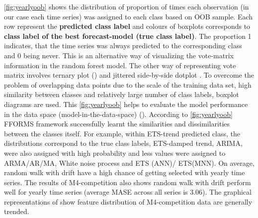 \documentclass[11pt,a4paper,]{article}
\begin{document}
\autoref{fig:yearlyoob} shows the distribution of proportion of times
each observation (in our case each time series) was assigned to each
class based on OOB sample. Each row represent the \textbf{predicted
class label} and colours of boxplots corresponds to \textbf{class label
of the best forecast-model (true class label)}. The proportion 1
indicates, that the time series was always predicted to the
corresponding class and 0 being never. This is an alternative way of
visualizing the vote-matrix information in the random forest model. The
other way of representing vote matrix involves ternary plot
(\textcite{sutherland2000orca}) and jittered side-by-side dotplot
\autocites{ehrlinger2015ggrandomforests}{da2017interactive}. To overcome
the problem of overlapping data points due to the scale of the training
data set, high similarity between classes and relatively large number of
class labels, boxplot diagrams are used. This \autoref{fig:yearlyoob}
helps to evaluate the model performance in the data space
(model-in-the-data-space) (\textcite{da2017interactive}). According to
\autoref{fig:yearlyoob} FFORMS framework successfully learnt the
similarities and dissimilarities between the classes itself. For
example, within ETS-trend predicted class, the distributions correspond
to the true class labels, ETS-damped trend, ARIMA, were also assigned
with high probability and less values were assigned to ARMA/AR/MA, White
noise process and ETS (ANN)/ ETS(MNN). On average, random walk with
drift have a high chance of getting selected with yearly time series.
The results of M4-competition also shows random walk with drift perform
well for yearly time series (average MASE across all series is 3.06).
The graphical representations of \textcite{kang2018efficient} show
feature distribution of M4-competition data are generally trended.
\end{document}
